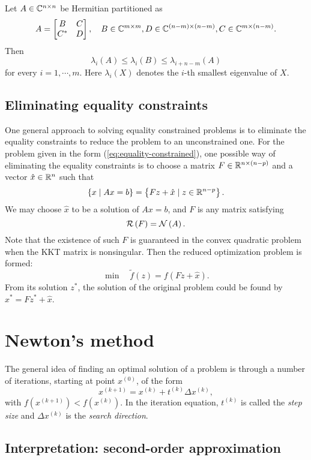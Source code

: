 \documentclass[12pt]{article}
\begin{document}
\begin{theorem}
    Let \(A\in\mathbb C^{n\times n}\) be Hermitian partitioned as
    \[A=\begin{bmatrix}
        B&C\\C^\ast&D
    \end{bmatrix},\quad B\in\mathbb C^{m\times m},D\in\mathbb C^{(n-m)\times(n-m)},C\in\mathbb C^{m\times(n-m)}.\]
    Then
    \[\lambda_i(A)\leqslant\lambda_i(B)\leqslant \lambda_{i+n-m}(A)\]
    for every \(i=1,\cdots,m\). Here \(\lambda_i(X)\) denotes the \(i\)-th smallest eigenvalue of \(X\).
\end{theorem}

\subsection{Eliminating equality constraints}

One general approach to solving equality constrained problems is to eliminate the equality constraints to reduce the problem to an unconstrained one. For the problem given in the form (\ref{eq:equality-constrained}), one possible way of eliminating the equality constraints is to choose a matrix \(F\in\mathbb R^{n\times(n-p)}\) and a vector \(\hat x\in\mathbb R^n\) such that
\[\left\{x\mid Ax=b\right\}=\left\{Fz+\hat x\mid z\in\mathbb R^{n-p}\right\}.\]
We may choose \(\hat x\) to be a solution of \(Ax=b\), and \(F\) is any matrix satisfying
\[\mathcal R\left(F\right)=\mathcal N\left(A\right).\]
Note that the existence of such \(F\) is guaranteed in the convex quadratic problem when the KKT matrix is nonsingular. Then the reduced optimization problem is formed:
\[\min\quad \tilde f(z)=f(Fz+\hat x).\]
From its solution \(z^\ast\), the solution of the original problem could be found by \(x^\ast=Fz^\ast+\hat x\).

\section{Newton's method}

The general idea of finding an optimal solution of a problem is through a number of iterations, starting at point \(x^{(0)}\), of the form
\[x^{(k+1)}=x^{(k)}+t^{(k)}\Delta x^{(k)},\]
with \(f\left(x^{(k+1)}\right)<f\left(x^{(k)}\right)\). In the iteration equation, \(t^{(k)}\) is called the \textit{step size} and \(\Delta x^{(k)}\) is the \textit{search direction}.

\subsection{Interpretation: second-order approximation}
\end{document}
